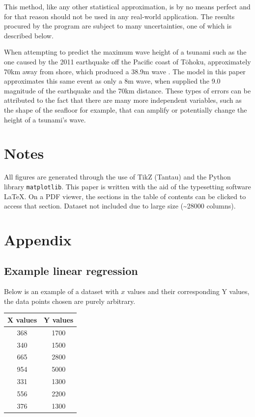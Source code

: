 \documentclass[11pt,letterpaper]{article}
\begin{document}
This method, like any other statistical approximation, is by no means perfect
and for that reason should not be used in any real-world application. The results
procured by the program are subject to many uncertainties, one of which is described
below.

When attempting to predict the maximum wave height of a tsunami such as the one
caused by the 2011 earthquake off the Pacific coast of Tōhoku, approximately 70km
away from shore, which produced a 38.9m wave \cite{yomiuri_2011}. The model in this
paper approximates this same event as only a 8m wave, when supplied the 9.0 magnitude
of the earthquake and the 70km distance. These types of errors can be attributed to the
fact that there are many more independent variables, such as the shape of the seafloor for
example, that can amplify or potentially change the height of a tsunami's wave.


\newpage
{}


\section*{Notes}
\label{sec:notes}

All figures are generated through the use of TikZ (Tantau) and the Python library 
\verb|matplotlib|. This paper is written with the aid of the typesetting software \LaTeX. 
On a PDF viewer, the sections in the table of contents can be clicked to access that 
section. Dataset not included due to large size (\textasciitilde 28000 columns).

\printbibliography[heading=bibintoc, title=Works Cited]

\appendix
\section{Appendix}
\label{app}
\subsection{Example linear regression}
\label{app:regression}

Below is an example of a dataset with $x$ values and their corresponding
Y values, the data points chosen are purely arbitrary.

\begin{center}
    \begin{tabular}{||c c||}
        \hline
        X values & Y values \\ [0.5ex]
        \hline\hline
        368      & 1700     \\
        \hline
        340      & 1500     \\
        \hline
        665      & 2800     \\
        \hline
        954      & 5000     \\
        \hline
        331      & 1300     \\
        \hline
        556      & 2200     \\
        \hline
        376      & 1300     \\ [1ex]
        \hline
    \end{tabular}
\end{center}
\end{document}
